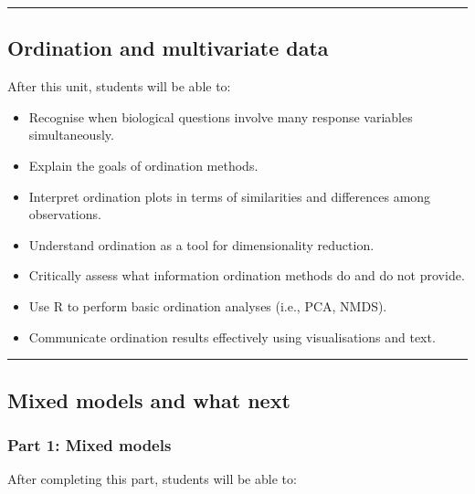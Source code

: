 \documentclass[
  letterpaper,
  8pt,
  a4paper]{book}
\providecommand{\tightlist}{%
  \setlength{\itemsep}{0pt}\setlength{\parskip}{0pt}}
\begin{document}
\begin{center}\rule{0.5\linewidth}{0.5pt}\end{center}

\subsection*{Ordination and multivariate
data}\label{ordination-and-multivariate-data}

After this unit, students will be able to:

\begin{itemize}
\tightlist
\item
  Recognise when biological questions involve many response variables
  simultaneously.
\item
  Explain the goals of ordination methods.
\item
  Interpret ordination plots in terms of similarities and differences
  among observations.
\item
  Understand ordination as a tool for dimensionality reduction.
\item
  Critically assess what information ordination methods do and do not
  provide.
\item
  Use R to perform basic ordination analyses (i.e., PCA, NMDS).
\item
  Communicate ordination results effectively using visualisations and
  text.
\end{itemize}

\begin{center}\rule{0.5\linewidth}{0.5pt}\end{center}

\subsection*{Mixed models and what
next}\label{mixed-models-and-what-next}

\subsubsection*{Part 1: Mixed models}\label{part-1-mixed-models}

After completing this part, students will be able to:
\end{document}
